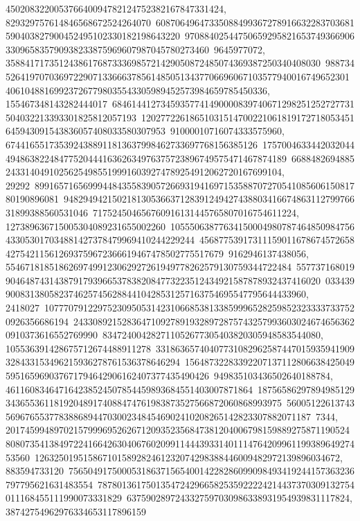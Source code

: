{{{450208322005376640094782124752382167847331424, 829329757614846568672524264070\
60870649647335088499367278916632283703681590403827900452495102330182198643220\
97088402544750659295821653749366906330965835790938233875969607987045780273460\
9645977072, 35884171735124386176873336985721429050872485074369387250340408030\
98873452641970703697229071336663785614850513437706696067103577940016749652301\
406104881699237267798035543305989452573984659785450336, 155467348143282444017\
68461441273459357741490000839740671298251252727731504032213393301825812057193\
12027722618651031514700221061819172718053451645943091543836057408033580307953\
91000010716074333575960, 6744165517353924388911813637998462733697768156385126\
17570046334420320444948638224847752044416362634976375723896749575471467874189\
6688482694885243314049102562549855199916039274789254912062720167699104, 29292\
89916571656999448435583905726693194169715358870727054108560615081780190896081\
94829494215021813053663712839124942743880341667486311279976631899388560531046\
717524504656760916131445765807016754611224, 127389636715005304089231655002260\
10555063877634150004980787464850984756433053017034881427378479969410244229244\
45687753917311159011678674572658427542115612693759672366619467478502775517679\
9162946137438056, 55467181851862697499123062927261949778262579130759344722484\
55773716801990464874314387917939665378382084773223512434921587878932437416020\
03343990083138058237462574562884410428531257163754695547795644433960, 2418027\
10777079122975230950531423106685381338599965282598523233337337520926356686194\
24330892152836471092789193289728757432579936030246746563620910373616552769990\
834724004282711052677305403820305948583544080, 105536391428675712674488911278\
33186365740407731082962587447015935941909328433153496215936278761536378646294\
15648732283392207137112806638425049595165969037671794642906162407377435490426\
949835103436502640188784, 461160834647164238524507854459893684551403007871864\
18756586297894985129343655361181920489174088474761983873527566872060868993975\
56005122613743569676553778388689447030023484546902410208265142823307882071187\
7344, 20174599489702157999695262671209352356847381204006798159889275871190524\
80807354138497224166426304067602099114443933140111476420996119938964927453560\
126325019515867101589282461232074298388446009482972139896034672, 883594733120\
75650491750005318637156540014228286099098493419244157363236797795621631483554\
78780136175013547242966582535922224214437370309132754011168455111990073331829\
6375902897243327597030986338931954939831117824, 38742754962976334653117896159\
}}}
